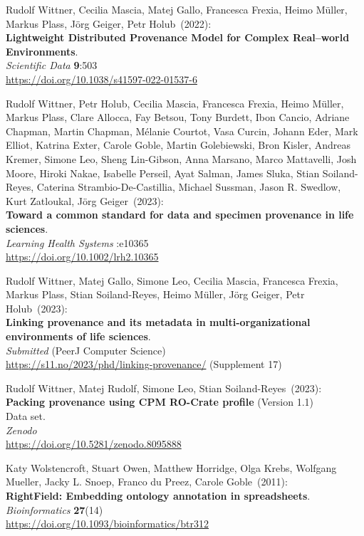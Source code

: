 \begin{thebibliography}{9}
Rudolf Wittner, Cecilia Mascia, Matej Gallo, Francesca Frexia, Heimo Müller, Markus Plass, Jörg Geiger, Petr Holub~(2022): \\
\textbf{Lightweight Distributed Provenance Model for Complex Real--world Environments}.\\
\emph{Scientific Data} \textbf{9}:503 \\
\url{https://doi.org/10.1038/s41597-022-01537-6}

Rudolf Wittner, Petr Holub, Cecilia Mascia, Francesca Frexia, Heimo Müller, Markus Plass, Clare Allocca, Fay Betsou, Tony Burdett, Ibon Cancio, Adriane Chapman, Martin Chapman, Mélanie Courtot, Vasa Curcin, Johann Eder, Mark Elliot, Katrina Exter, Carole Goble, Martin Golebiewski, Bron Kisler, Andreas Kremer, Simone Leo, Sheng Lin-Gibson, Anna Marsano, Marco Mattavelli, Josh Moore, Hiroki Nakae, Isabelle Perseil, Ayat Salman, James Sluka, Stian Soiland-Reyes, Caterina Strambio-De-Castillia, Michael Sussman, Jason R. Swedlow, Kurt Zatloukal, Jörg Geiger~(2023): \\
\textbf{Toward a common standard for data and specimen provenance in life sciences}.\\
\emph{Learning Health Systems} :e10365 \\
\url{https://doi.org/10.1002/lrh2.10365}

Rudolf Wittner, Matej Gallo, Simone Leo, Cecilia Mascia, Francesca Frexia, Markus Plass, Stian Soiland-Reyes, Heimo Müller, Jörg Geiger, Petr Holub~(2023): \\
\textbf{Linking provenance and its metadata in multi-organizational environments of life sciences}.\\
\emph{Submitted} (PeerJ Computer Science)\\
\url{https://s11.no/2023/phd/linking-provenance/}
(Supplement 17)

Rudolf Wittner, Matej Rudolf, Simone Leo, Stian Soiland-Reyes~(2023): \\
\textbf{Packing provenance using CPM RO-Crate profile} (Version 1.1)\\
Data set.\\
\emph{Zenodo}\\
\url{https://doi.org/10.5281/zenodo.8095888}

Katy Wolstencroft, Stuart Owen, Matthew Horridge, Olga Krebs, Wolfgang Mueller, Jacky L. Snoep, Franco du Preez, Carole Goble~(2011): \\
\textbf{RightField: Embedding ontology annotation in spreadsheets}. \\
\emph{Bioinformatics} \textbf{27}(14) \\
\url{https://doi.org/10.1093/bioinformatics/btr312}


\end{thebibliography}
